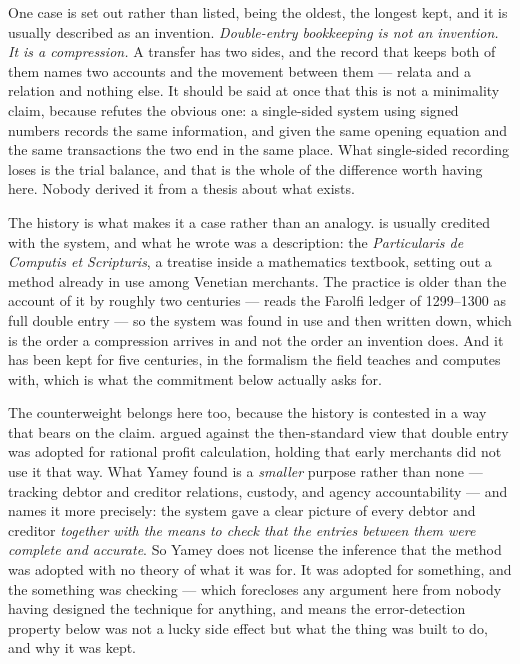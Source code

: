 \documentclass[11pt,a4paper]{article}
\begin{document}
One case is set out rather than listed, being the oldest, the longest kept,
and it is usually described as an invention. \emph{Double-entry bookkeeping is not an invention. It is
a compression.} A transfer has two sides, and the record that keeps both of them names two accounts and the movement
between them --- relata and a relation and nothing else. It should be said at once that this
is not a minimality claim, because \citeauthor{ellerman2014} refutes the obvious one: a single-sided
system using signed numbers records the same information, and given the same opening equation and the
same transactions the two end in the same place. What single-sided recording loses is the trial
balance, and that is the whole of the difference worth having here. Nobody derived it from a thesis about what exists.

The history is what makes it a case rather than an analogy. \citet{pacioli1494} is usually credited
with the system, and what he wrote was a description: the \emph{Particularis de Computis et Scripturis},
a treatise inside a mathematics textbook, setting out a method already in use among Venetian merchants.
The practice is older than the account of it by roughly two centuries --- \citet{lee1977} reads the
Farolfi ledger of 1299--1300 as full double entry --- so the system was found in use and then written
down, which is the order a compression arrives in and not the order an invention does. And it has been
kept for five centuries, in the formalism the field teaches and computes with, which is what the
commitment below actually asks for.

The counterweight belongs here too, because the history is contested in a way that bears on the
claim. \citet{yamey1949} argued against the then-standard view that double entry was adopted for
rational profit calculation, holding that early merchants did not use it that way. What Yamey found
is a \emph{smaller} purpose rather than none --- tracking debtor and creditor relations, custody,
and agency accountability --- and \citet{sangster2016} names it more precisely: the system gave a
clear picture of every debtor and creditor \emph{together with the means to check that the entries
between them were complete and accurate}. So Yamey does not license the inference that the method
was adopted with no theory of what it was for. It was adopted for something, and the something was
checking --- which forecloses any argument here from nobody having designed the technique for
anything, and means the error-detection property below was not a lucky side effect but what the
thing was built to do, and why it was kept.
\end{document}
